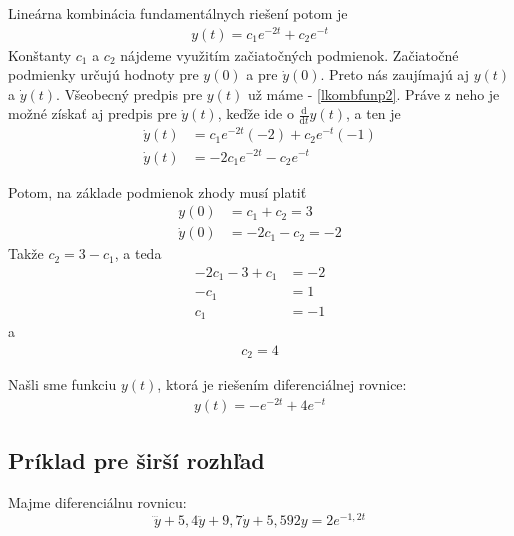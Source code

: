 \documentclass[a4paper, 10pt, ]{article}
\begin{document}
Lineárna kombinácia fundamentálnych riešení potom je
\begin{align} \label{lkombfunp2}
    y(t) = c_1 e^{-2t} + c_2 e^{-t}
\end{align}
Konštanty $c_1$ a $c_2$ nájdeme využitím začiatočných podmienok. Začiatočné podmienky určujú hodnoty pre $y(0)$ a pre $\dot y(0)$. Preto nás zaujímajú aj $y(t)$ a $\dot y(t)$. Všeobecný predpis pre $y(t)$ už máme - \eqref{lkombfunp2}. Práve z neho je možné získať aj predpis pre $\dot y(t)$, keďže ide o $\frac{\text{d}}{\text{d}t}y(t)$, a ten je
\begin{subequations}
    \begin{align}
        \dot y(t) &= c_1 e^{-2t} (-2) + c_2 e^{-t} (-1) \\
        \dot y(t) &= -2 c_1 e^{-2t} - c_2 e^{-t}
    \end{align}
\end{subequations}

Potom, na základe podmienok zhody musí platiť
\begin{subequations}
    \begin{align}
        y(0) &= c_1 + c_2 = 3 \\
        \dot y(0) &= -2 c_1  - c_2  = -2
    \end{align}
\end{subequations}
Takže $c_2 = 3-c_1$, a teda
\begin{subequations}
    \begin{align}
         -2 c_1  - 3 + c_1 &= -2 \\
         -c_1 &= 1 \\
         c_1 &= -1
    \end{align}
\end{subequations}
a
\begin{align}
     c_2 = 4
\end{align}

Našli sme funkciu $y(t)$, ktorá je riešením diferenciálnej rovnice:
\begin{align}
     y(t) = - e^{-2t} + 4 e^{-t}
\end{align}




\subsection{Príklad pre širší rozhľad}
\label{Príklad pre širší rozhľad}


Majme diferenciálnu rovnicu:
\begin{equation} \label{Zadaná rovnica}
	\dddot{y} + 5,4 \ddot{y} + 9,7 \dot{y} + 5,592 y = 2 e^{-1,2t}
\end{equation}
\end{document}
